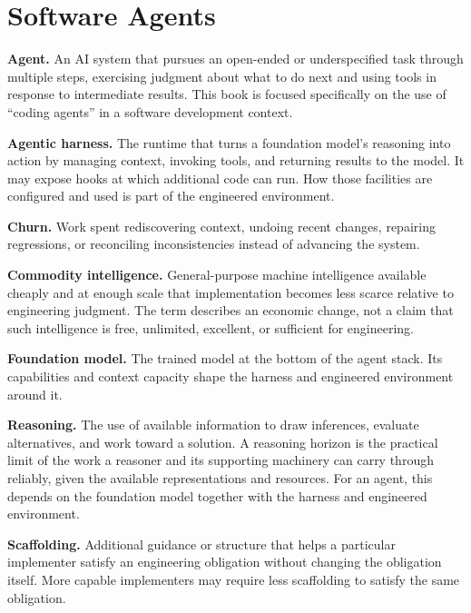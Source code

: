\section{Software Agents}\label{heading:software-agents}

\textbf{Agent.} An AI system that pursues an open-ended or underspecified task through multiple steps, exercising judgment about what to do next and using tools in response to intermediate results. This book is focused specifically on the use of ``coding agents'' in a software development context. 

\textbf{Agentic harness.} The runtime that turns a foundation model’s reasoning into action by managing context, invoking tools, and returning results to the model. It may expose hooks at which additional code can run. How those facilities are configured and used is part of the engineered environment.


\textbf{Churn.} Work spent rediscovering context, undoing recent changes, repairing regressions, or reconciling inconsistencies instead of advancing the system.


\textbf{Commodity intelligence.} General-purpose machine intelligence available cheaply and at enough scale that implementation becomes less scarce relative to engineering judgment. The term describes an economic change, not a claim that such intelligence is free, unlimited, excellent, or sufficient for engineering.

\textbf{Foundation model.} The trained model at the bottom of the agent stack. Its capabilities and context capacity shape the harness and engineered environment around it.

\textbf{Reasoning.} The use of available information to draw inferences, evaluate alternatives, and work toward a solution. A reasoning horizon is the practical limit of the work a reasoner and its supporting machinery can carry through reliably, given the available representations and resources. For an agent, this depends on the foundation model together with the harness and engineered environment.

\textbf{Scaffolding.} Additional guidance or structure that helps a particular implementer satisfy an engineering obligation without changing the obligation itself. More capable implementers may require less scaffolding to satisfy the same obligation.

